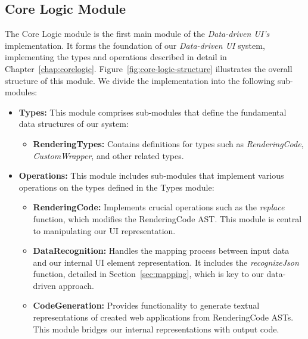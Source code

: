 \subsection{Core Logic Module}
The Core Logic module is the first main module of the \emph{Data-driven UI's} implementation.
It forms the foundation of our \emph{Data-driven UI} system, implementing the types and operations described in detail in Chapter~\ref{chap:corelogic}.
Figure~\ref{fig:core-logic-structure} illustrates the overall structure of this module.
We divide the implementation into the following sub-modules:
\begin{itemize}
	\item \textbf{Types:} This module comprises sub-modules that define the fundamental data structures of our system:
	      \begin{itemize}
		      \item \textbf{RenderingTypes:} Contains definitions for types such as \emph{RenderingCode}, \emph{CustomWrapper}, and other related types.

	      \end{itemize}

	\item \textbf{Operations:} This module includes sub-modules that implement various operations on the types defined in the Types module:
	      \begin{itemize}
		      \item \textbf{RenderingCode:} Implements crucial operations such as the \emph{replace} function, which modifies the RenderingCode AST.
		            This module is central to manipulating our UI representation.

		      \item \textbf{DataRecognition:}  Handles the mapping process between input data and our internal UI element representation.
		            It includes the \emph{recognizeJson} function, detailed in Section~\ref{sec:mapping}, which is key to our data-driven approach.

		      \item\textbf{CodeGeneration:} Provides functionality to generate textual representations of created web applications from RenderingCode ASTs.
		            This module bridges our internal representations with output code.
	      \end{itemize}
\end{itemize}


